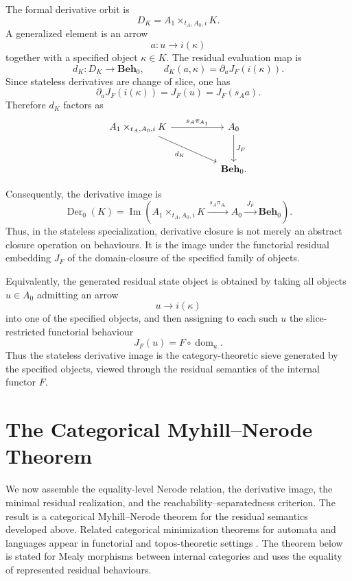 The formal derivative orbit is
\[
    D_K
        =
    A_1\times_{t_A,A_0,i}K.
\]
A generalized element is an arrow
\[
    a:u\to i(\kappa)
\]
together with a specified object \(\kappa\in K\). The residual evaluation map is
\[
    d_K:D_K\to \mathbf{Beh}_0,
    \qquad
    d_K(a,\kappa)
        =
    \partial_a J_F(i(\kappa)).
\]
Since stateless derivatives are change of slice, one has
\[
    \partial_a J_F(i(\kappa))
        =
    J_F(u)
        =
    J_F(s_Aa).
\]
Therefore \(d_K\) factors as
\[
    \begin{tikzcd}[column sep=huge, row sep=large]
            A_1\times_{t_A,A_0,i}K
                \arrow[r, "s_A\pi_{A_1}"]
                \arrow[dr, "d_K"']
        &
            A_0
                \arrow[d, "J_F"]
        \\
        &
            \mathbf{Beh}_0 .
    \end{tikzcd}
\]

Consequently, the derivative image is
\[
    \operatorname{Der}_0(K)
        =
    \operatorname{Im}
    \left(
        A_1\times_{t_A,A_0,i}K
            \xrightarrow{\;s_A\pi_{A_1}\;}
        A_0
            \xrightarrow{\;J_F\;}
        \mathbf{Beh}_0
    \right).
\]
Thus, in the stateless specialization, derivative closure is not merely an abstract closure operation on behaviours. It is the image under the functorial residual embedding \(J_F\) of the domain-closure of the specified family of objects.

Equivalently, the generated residual state object is obtained by taking all objects \(u\in A_0\) admitting an arrow
\[
    u\to i(\kappa)
\]
into one of the specified objects, and then assigning to each such \(u\) the slice-restricted functorial behaviour
\[
    J_F(u)=F\circ\operatorname{dom}_u.
\]
Thus the stateless derivative image is the category-theoretic sieve generated by the specified objects, viewed through the residual semantics of the internal functor \(F\).

\section{The Categorical Myhill--Nerode Theorem}
\label{sec:categorical-myhill-nerode-theorem}

We now assemble the equality-level Nerode relation, the derivative image, the minimal residual realization, and the reachability--separatedness criterion. The result is a categorical Myhill--Nerode theorem for the residual semantics developed above. Related categorical minimization theorems for automata and languages appear in functorial and topos-theoretic settings \cite{ColcombetPetrisan2020,Iwaniack2023}. The theorem below is stated for Mealy morphisms between internal categories and uses the equality of represented residual behaviours.


